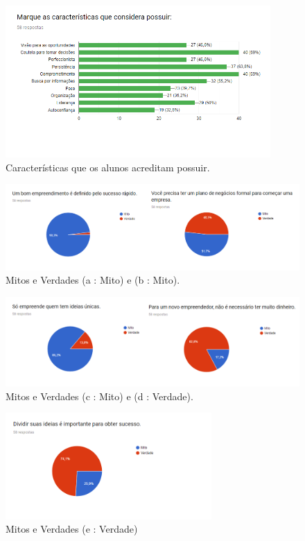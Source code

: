 \begin{figure}[!htb]
    \centering
    \includegraphics[width=0.9\textwidth]{img/habilidades.PNG}
    \caption{Características que os alunos acreditam possuir.}
    \label{fig:caract}
\end{figure}

\begin{figure}[!htb]
    \centering
    \includegraphics[width=1.0\textwidth]{img/mv1-2.png}
    \caption{Mitos e Verdades (a : Mito) e (b : Mito).}
    \label{fig:mv1-2}
\end{figure}

\begin{figure}[!htb]
    \centering
    \includegraphics[width=1.0\textwidth]{img/mv3-4.png}
    \caption{ Mitos e Verdades (c : Mito) e (d : Verdade).}
    \label{fig:mv3-4}
\end{figure}

\begin{figure}[!htb]
    \centering
    \includegraphics[width=0.7\textwidth]{img/mv5.PNG}
    \caption{Mitos e Verdades (e : Verdade)}
    \label{fig:mv5}
\end{figure}

